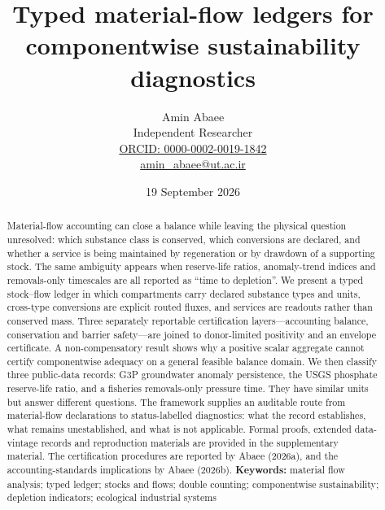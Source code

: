 \documentclass[11pt]{article}
\title{Typed material-flow ledgers for componentwise sustainability diagnostics}
\author{Amin Abaee\\[0.25em]
{\small Independent Researcher}\\[0.25em]
{\small\href{https://orcid.org/0000-0002-0019-1842}{ORCID: 0000-0002-0019-1842}}\\[0.25em]
{\small\href{mailto:amin\_abaee@ut.ac.ir}{amin\_abaee@ut.ac.ir}}}
\date{19 September 2026}
\begin{document}
\maketitle
\begin{abstract}
Material-flow accounting can close a balance while leaving the physical question unresolved: which substance class is conserved, which conversions are declared, and whether a service is being maintained by regeneration or by drawdown of a supporting stock. The same ambiguity appears when reserve-life ratios, anomaly-trend indices and removals-only timescales are all reported as ``time to depletion''. We present a typed stock--flow ledger in which compartments carry declared substance types and units, cross-type conversions are explicit routed fluxes, and services are readouts rather than conserved mass. Three separately reportable certification layers---accounting balance, conservation and barrier safety---are joined to donor-limited positivity and an envelope certificate. A non-compensatory result shows why a positive scalar aggregate cannot certify componentwise adequacy on a general feasible balance domain. We then classify three public-data records: G3P groundwater anomaly persistence, the USGS phosphate reserve-life ratio, and a fisheries removals-only pressure time. They have similar units but answer different questions. The framework supplies an auditable route from material-flow declarations to status-labelled diagnostics: what the record establishes, what remains unestablished, and what is not applicable. Formal proofs, extended data-vintage records and reproduction materials are provided in the supplementary material. The certification procedures are reported by Abaee (2026a), and the accounting-standards implications by Abaee (2026b).
\textbf{Keywords:} material flow analysis; typed ledger; stocks and flows; double counting; componentwise sustainability; depletion indicators; ecological industrial systems
\end{abstract}
\end{document}
